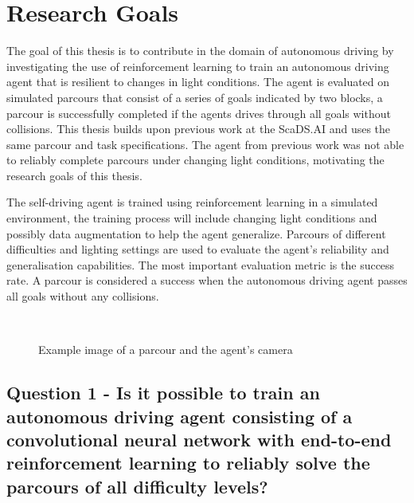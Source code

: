\chapter{Research Goals}
\label{cha:ResearchGoals}

The goal of this thesis is to contribute in the domain of autonomous driving by investigating the use of reinforcement learning to train an autonomous driving agent that is resilient to changes in light conditions. The agent is evaluated on  simulated parcours that consist of a series of goals indicated by two blocks, a parcour is successfully completed if the agents drives through all goals without collisions.
This thesis builds upon previous work at the ScaDS.AI \textcite{maximilian} and uses the same parcour and task specifications. The agent from previous work was not able to reliably complete parcours under changing light conditions, motivating the research goals of this thesis.


The self-driving agent is trained using reinforcement learning in a simulated environment, the training process will include changing light conditions and possibly data augmentation to help the agent generalize.
Parcours of different difficulties and lighting settings are used to evaluate the agent's reliability and generalisation capabilities. The most important evaluation metric is the success rate. A parcour is considered a success when the autonomous driving agent passes all goals without any collisions.


\begin{figure}
    \centering
    \qquad
    \\
    \caption{Example image of a parcour and the agent's camera}
\end{figure}


\section{Question 1 - Is it possible to train an autonomous driving agent consisting of a convolutional neural network with end-to-end reinforcement learning to reliably solve the parcours of all difficulty levels?}

